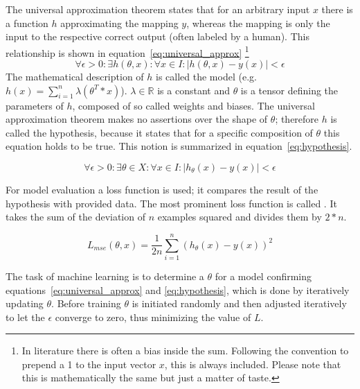 The universal approximation theorem\cite{Cybenko1989}\cite{Hornik1989} states that for an arbitrary input $x$ there is a function $h$ approximating the mapping $y$, whereas the mapping is only the input to the respective correct output (often labeled by a human).
This relationship is shown in equation~\eqref{eq:universal_approx} \footnote{In literature there is often a bias inside the sum.
Following the convention to prepend a 1 to the input vector $x$, this is always included.
Please note that this is mathematically the same but just a matter of taste.
}
\begin{equation}\label{eq:universal_approx}
    \forall \epsilon > 0 :
    \exists h(\theta, x) : \forall x \in I : | h(\theta, x) - y(x) | < \epsilon
\end{equation}
The mathematical description of $h$ is called the model (e.g.  $h(x) = \sum_{i=1}^n{\lambda (\theta^T * x)}$).
$\lambda \in \mathbb{R}$ is a constant and $\theta$ is a tensor defining the parameters of $h$, composed of so called weights and biases. %
The universal approximation theorem makes no assertions over the shape of $\theta$; therefore $h$ is called the hypothesis, because it states that for a specific composition of $\theta$ this equation holds to be true.
This notion is summarized in equation~\eqref{eq:hypothesis}.

\begin{equation} \label{eq:hypothesis}
    \forall \epsilon > 0 : \exists \theta \in X : \forall x \in I : |
    h_\theta(x) - y(x) | < \epsilon
\end{equation}

For model evaluation a loss function is used; it compares the result of the hypothesis with provided data.
The most prominent loss function is called .
It takes the sum of the deviation of $n$ examples squared and divides them by $2*n$.

\begin{equation} \label{eq:mse}
    L_{mse}(\theta, x) = \frac{1}{2 n} \sum_{i=1}^n (h_\theta(x) - y(x))^2\end{equation} 

The task of machine learning is to determine a $\theta$ for a model confirming equations~\ref{eq:universal_approx} and \ref{eq:hypothesis}, which is done by iteratively updating $\theta$. 
Before training $\theta$ is initiated randomly and then adjusted iteratively to let the $\epsilon$ converge to zero, thus minimizing the value of $L$.

